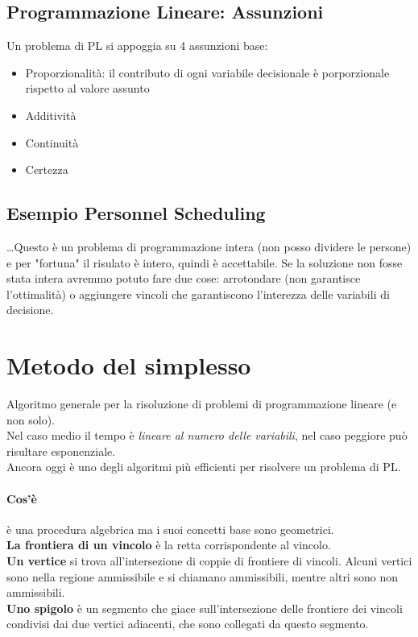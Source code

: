 \documentclass[12pt, a4paper, openany]{book}
\begin{document}
\subsection*{Programmazione Lineare: Assunzioni}
Un problema di PL si appoggia su 4 assunzioni base:
\begin{itemize}
    \item Proporzionalità: il contributo di ogni variabile decisionale è porporzionale rispetto al valore assunto
    \item Additività
    \item Continuità
    \item Certezza
\end{itemize}

\subsection*{Esempio Personnel Scheduling}
\dots Questo è un problema di programmazione intera (non posso dividere le persone) e per "fortuna" il risulato è intero, quindi è accettabile.
Se la soluzione non fosse stata intera avremmo potuto fare due cose: arrotondare (non garantisce l'ottimalità) o aggiungere vincoli che garantiscono l'interezza delle variabili di decisione.

\section*{Metodo del simplesso}
Algoritmo generale per la risoluzione di problemi di programmazione lineare (e non solo).
\\Nel caso medio il tempo è \emph{lineare al numero delle variabili}, nel caso peggiore può risultare esponenziale.
\\Ancora oggi è uno degli algoritmi più efficienti per risolvere un problema di PL.

\paragraph*{Cos'è} è una procedura algebrica ma i suoi concetti base sono geometrici.
\\\textbf{La frontiera di un vincolo} è la retta corrispondente al vincolo.
\\\textbf{Un vertice} si trova all'intersezione di coppie di frontiere di vincoli.
Alcuni vertici sono nella regione ammissibile e si chiamano ammissibili, mentre altri sono non ammissibili.
\\\textbf{Uno spigolo} è un segmento che giace sull'intersezione delle frontiere dei vincoli condivisi dai due vertici adiacenti, che sono collegati da questo segmento.
\end{document}
